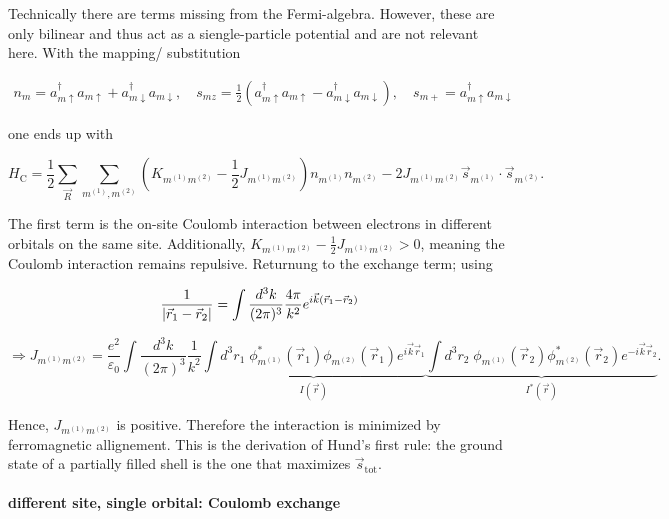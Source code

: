 \documentclass[../../main.tex]{subfiles}
\begin{document}
Technically there are terms missing from the Fermi-algebra. However, these are only bilinear and thus act as a siengle-particle potential and are not relevant here. With the mapping/ substitution


\begin{gather}
	n_{m} = a_{m\uparrow}^\dagger a_{m\uparrow} + a_{m\downarrow}^\dagger a_{m\downarrow} , \quad	s_{mz} = \frac12 \left(a_{m\uparrow}^\dagger a_{m\uparrow} - a_{m\downarrow}^\dagger a_{m\downarrow}\right), \quad s_{m+} = a_{m\uparrow}^\dagger a_{m\downarrow}
\end{gather}

one ends up with 

\begin{equation}
	H_{\text{C}} = \frac12 \sum_{\vec{R}} \sum_{m^{(1)}, m^{(2)}}  \left( K_{m^{(1)} m^{(2)}} - \frac12 J_{m^{(1)} m^{(2)}} \right) n_{m^{(1)}}n_{m^{(2)}} - 2J_{m^{(1)}m^{(2)}} \vec{s}_{m^{(1)}} \cdot \vec{s}_{m^{(2)}}.
\end{equation}

The first term is the on-site Coulomb interaction between electrons in different orbitals on the same site. Additionally, $K_{m^{(1)}m^{(2)}} - \frac12 J_{m^{(1)}m^{(2)}} > 0$, meaning the Coulomb interaction remains repulsive. Returnung to the exchange term; using

\begin{equation}
	\frac{1}{\abs{\vec{r}_1-\vec{r}_2}} = \int \frac{d^3k}{(2\pi)^3} \frac{4\pi}{k^2}e^{i\vec{k}(\vec{r}_1-\vec{r}_2)}
\end{equation}

\begin{equation}
	\Rightarrow J_{m^{(1)}m^{(2)}} = \frac{e^2}{\varepsilon_0} \int \frac{d^3k}{(2\pi)^3} \frac{1}{k^2} \underbrace{\int d^3r_1 \; \phi_{m^{(1)}}^*(\vec{r}_1) \phi_{m^{(2)}}(\vec{r}_1) e^{i\vec{k}\vec{r}_1}}_{I(\vec{r})} \underbrace{\int d^3r_2 \; \phi_{m^{(1)}}(\vec{r}_2) \phi_{m^{(2)}}^*(\vec{r}_2) e^{-i\vec{k}\vec{r}_2}}_{I^*(\vec{r})}.
\end{equation}

Hence, $J_{m^{(1)}m^{(2)}}$ is positive. Therefore the interaction is minimized by ferromagnetic allignement. This is the derivation of Hund's first rule: the ground state of a partially filled shell is the one that maximizes $\vec{s}_{\text{tot}}$. 

\paragraph{different site, single orbital: Coulomb exchange} 
\end{document}

